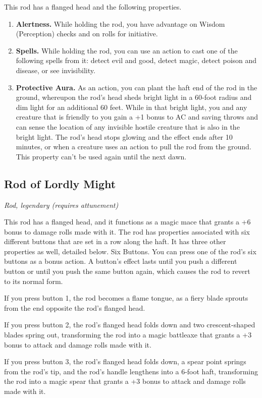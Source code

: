 This rod has a flanged head and the following properties.
\begin{enumerate}

\item \textbf{Alertness.} While holding the rod, you have advantage on Wisdom (Perception) checks and on rolls for initiative.
\item \textbf{Spells.} While holding the rod, you can use an action to cast one of the following spells from it: detect evil and good, detect magic, detect poison and disease, or see invisibility.
\item \textbf{Protective Aura.} As an action, you can plant the haft end of the rod in the ground, whereupon the rod's head sheds bright light in a 60-foot radius and dim light for an additional 60 feet. While in that bright light, you and any creature that is friendly to you gain a +1 bonus to AC and saving throws and can sense the location of any invisible hostile creature that is also in the bright light.  The rod's head stops glowing and the effect ends after 10 minutes, or when a creature uses an action to pull the rod from the ground. This property can't be used again until the next dawn.
\end{enumerate}

\subsection{Rod of Lordly Might}
\textit{Rod, legendary (requires attunement)}

This rod has a flanged head, and it functions as a magic mace that grants a +6 bonus to damage rolls made with it. The rod has properties associated with six different buttons that are set in a row along the haft. It has three other properties as well, detailed below.
Six Buttons. You can press one of the rod's six buttons as a bonus action. A button's effect lasts until you push a different button or until you push the same button again, which causes the rod to revert to its normal form.  

If you press button 1, the rod becomes a flame tongue, as a fiery blade sprouts from the end opposite the rod's flanged head.  

If you press button 2, the rod's flanged head folds down and two crescent-shaped blades spring out, transforming the rod into a magic battleaxe that grants a +3 bonus to attack and damage rolls made with it.  

If you press button 3, the rod's flanged head folds down, a spear point springs from the rod's tip, and the rod's handle lengthens into a 6-foot haft, transforming the rod into a magic spear that grants a +3 bonus to attack and damage rolls made with it.

